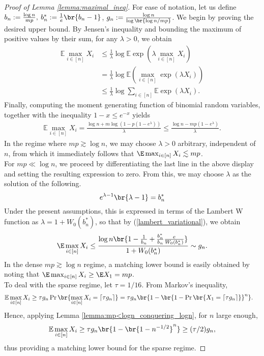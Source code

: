 %
\begin{proof}[Proof of Lemma \ref{lemma:maximal_ineq}]
For ease of notation, let us define $b_n := \frac{\log n}{mp},\: b_n^*:= \frac1e\br{b_n-1}$, $g_n := \frac{\log{n}}{\log\br{\log n / mp}}$. We begin by proving the desired upper bound. By Jensen's inequality and bounding the maximum of positive values by their sum, for any $\lambda > 0$, we obtain
\begin{align*}
    \mathbb{E}\max_{i  \in [n]} X_i & \leq \frac1\lambda \log \mathbb{E}\exp \left(\lambda \max_{i \in [n]} X_i\right) \\
    &=\frac1\lambda \log \mathbb{E}\left(\max_{i \in [n]} \exp\left(\lambda X_i\right)\right) \\
    &\leq \frac1\lambda \log \sum_{i \in [n]} \mathbb{E}\exp(\lambda X_i).
\end{align*}
Finally, computing the moment generating function of binomial random variables, together with the inequality $1-x\leq e^{-x}$ yields 
\begin{align*}
    \mathbb{E}\max_{i  \in [n]} X_i = \frac{\log{n} + m\log{(1 - p(1-e^\lambda))}}{\lambda} \leq \frac{\log{n} - mp(1 - e^\lambda)}{\lambda}. 
\end{align*}
In the regime where $mp \gtrsim \log n$, we may choose $\lambda > 0$ arbitrary, independent of $n$, from which it immediately follows that $\E \max_{i  \in [n]} X_i \lesssim mp$. \\
\noindent 
For $mp \ll \log n$, we proceed by differentiating the last line in the above display and setting the resulting expression to zero. From this, we may choose $\lambda$ as the solution of the following.
\[e^{\lambda -1}\br{\lambda -1} = b_n^*\]
Under the present assumptions, this is expressed in terms of the Lambert W function as $\lambda = 1+W_0(b_n^*)$, so that by (\ref{lambert_variational}), we obtain
\begin{align*}
    \E \max_{i \in [n]} X_i \leq \frac{\log n\br{1-\frac{1}{b_n}+\frac{b_n^*}{b_n} \frac{e}{W_0(b_n^*)}}}{1+W_0(b_n^*)} \sim g_n. 
\end{align*}
In the dense $mp \gtrsim \log{n}$ regime, a matching lower bound is easily obtained by noting that $\E \max_{i \in [n]} X_i \geq \E X_1 = mp$. \\
\noindent 
To deal with the sparse regime, let $\tau = 1/16$. From Markov's inequality, 
\begin{align*}\label{markov_initial}
\mathbb{E} \max_{i \in [n]} X_i &\geq  \tau g_n \Pr\br{\max_{i \in [n]} X_i = \lceil \tau g_n \rceil} = \tau g_n \br{1-\br{1-\Pr\br{X_1 = \lceil \tau g_n \rceil}}^n}.
\end{align*}
Hence, applying Lemma  \ref{lemma:mp<logn_conquering_logn}, for $n$ large enough, 
\begin{align*}
   \mathbb{E} \max_{i \in [n]} X_i  \geq \tau g_n \br{1-\br{1-n^{-1/2}}^n} \geq (\tau/2) g_n, 
\end{align*}
thus providing a matching lower bound for the sparse regime.


\end{proof}

